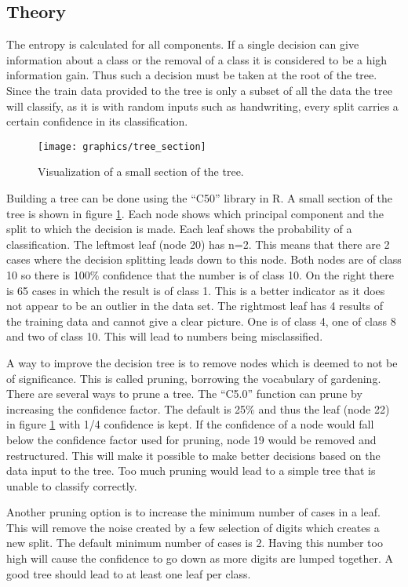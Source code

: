 \subsection{Theory}

The entropy is calculated for all components.
If a single decision can give information about a class or the removal of a class it is considered to be a high information gain.
Thus such a decision must be taken at the root of the tree.
Since the train data provided to the tree is only a subset of all the data the tree will classify, as it is with random inputs such as handwriting, every split carries a certain confidence in its classification.

\begin{figure}[h]
\texttt{[image: graphics/tree\_section]}
\caption[Visualization of a decision tree.]{Visualization of a small section of the tree.}
\label{fig:tree_section}
\end{figure}

Building a tree can be done using the ``C50'' library in R.
A small section of the tree is shown in figure \ref{fig:tree_section}.
Each node shows which principal component and the split to which the decision is made.
Each leaf shows the probability of a classification.
The leftmost leaf (node 20) has n=2. This means that there are 2 cases where the decision splitting leads down to this node.
Both nodes are of class 10 so there is 100\% confidence that the number is of class 10.
On the right there is 65 cases in which the result is of class 1. 
This is a better indicator as it does not appear to be an outlier in the data set.
The rightmost leaf has 4 results of the training data and cannot give a clear picture.
One is of class 4, one of class 8 and two of class 10. 
This will lead to numbers being misclassified.

A way to improve the decision tree is to remove nodes which is deemed to not be of significance.
This is called pruning, borrowing the vocabulary of gardening.
There are several ways to prune a tree.
The ``C5.0'' function can prune by increasing the confidence factor. 
The default is 25\% and thus the leaf (node 22) in figure \ref{fig:tree_section} with 1/4 confidence is kept.
If the confidence of a node would fall below the confidence factor used for pruning, node 19 would be removed and restructured.
This will make it possible to make better decisions based on the data input to the tree.
Too much pruning would lead to a simple tree that is unable to classify correctly.

Another pruning option is to increase the minimum number of cases in a leaf. 
This will remove the noise created by a few selection of digits which creates a new split.
The default minimum number of cases is 2.
Having this number too high will cause the confidence to go down as more digits are lumped together. 
A good tree should lead to at least one leaf per class.